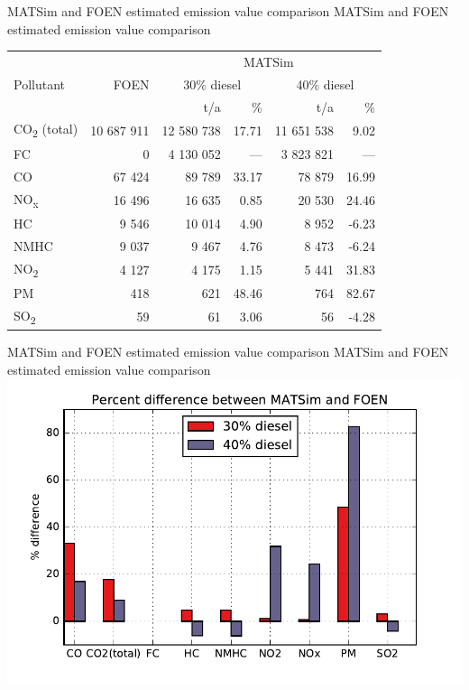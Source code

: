 
\createtable%
{MATSim and FOEN estimated emission value comparison}%
{MATSim and FOEN estimated emission value comparison}%
{\label{tab:emissionValueMatsimFoenComparison}}%
{%
  \begin{tabular}[c]{lrrrrr}
    \toprule
    \multirow{3}{*}{Pollutant} & \multirow{3}{*}{FOEN} & \multicolumn{4}{c}{MATSim} \\ 
    & & \multicolumn{2}{c}{30\% diesel} & \multicolumn{2}{c}{40\% diesel}\\
    & t/a & t/a & \% & t/a & \% \\
    \midrule
	CO\textsubscript{2} (total)  &  10 687 911 &    12 580 738 &	17.71 &	   11 651 538 &		 9.02 \\
	FC         					 &           0 &     4 130 052 &	  --- &     3 823 821 &		  --- \\
	CO         					 &      67 424 &        89 789 &	33.17 &        78 879 &		16.99 \\
	NO\textsubscript{x}     	 &      16 496 &        16 635 &	 0.85 &        20 530 &		24.46 \\
	HC       					 &       9 546 &        10 014 &	 4.90 &         8 952 &		-6.23 \\
	NMHC 					     &       9 037 &         9 467 &	 4.76 &         8 473 &		-6.24 \\
	NO\textsubscript{2}        	 &       4 127 &         4 175 &	 1.15 &         5 441 &		31.83 \\
	PM        					 &         418 &           621 &	48.46 &           764 &		82.67 \\
	SO\textsubscript{2}        	 &          59 &            61 &	 3.06 &            56 &		-4.28 \\
    \bottomrule
  \end{tabular}
}%
{}

\createfigure%
{MATSim and FOEN estimated emission value comparison}%
{MATSim and FOEN estimated emission value comparison}%
{\label{fig:emissionValueMatsimFoenComparison}}%
{\includegraphics[width=1.0\textwidth, angle=0]{figures/percent_differences.pdf}}%
{}


